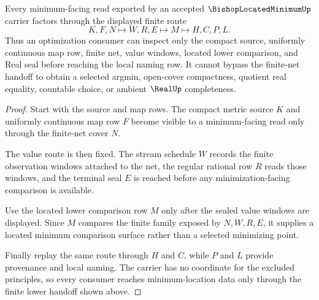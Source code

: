 \begin{theorem}
\label{thm:bishop-located-minimum-finite-net-lower-route}
Every minimum-facing read exported by an accepted $\BishopLocatedMinimumUp$ carrier factors through the displayed finite route
$$
K,F,N \longmapsto W,R,E \longmapsto M \longmapsto H,C,P,L .
$$
Thus an optimization consumer can inspect only the compact source, uniformly continuous map row, finite net, value windows, located lower comparison, and Real seal before reaching the local naming row. It cannot bypass the finite-net handoff to obtain a selected argmin, open-cover compactness, quotient real equality, countable choice, or ambient $\RealUp$ completeness.
\end{theorem}
\begin{proof}
Start with the source and map rows. The compact metric source $K$ and uniformly continuous map row $F$ become visible to a minimum-facing read only through the finite-net cover $N$.

The value route is then fixed. The stream schedule $W$ records the finite observation windows attached to the net, the regular rational row $R$ reads those windows, and the terminal seal $E$ is reached before any minimization-facing comparison is available.

Use the located lower comparison row $M$ only after the sealed value windows are displayed. Since $M$ compares the finite family exposed by $N,W,R,E$, it supplies a located minimum comparison surface rather than a selected minimizing point.

Finally replay the same route through $H$ and $C$, while $P$ and $L$ provide provenance and local naming. The carrier has no coordinate for the excluded principles, so every consumer reaches minimum-location data only through the finite lower handoff shown above.
\end{proof}


